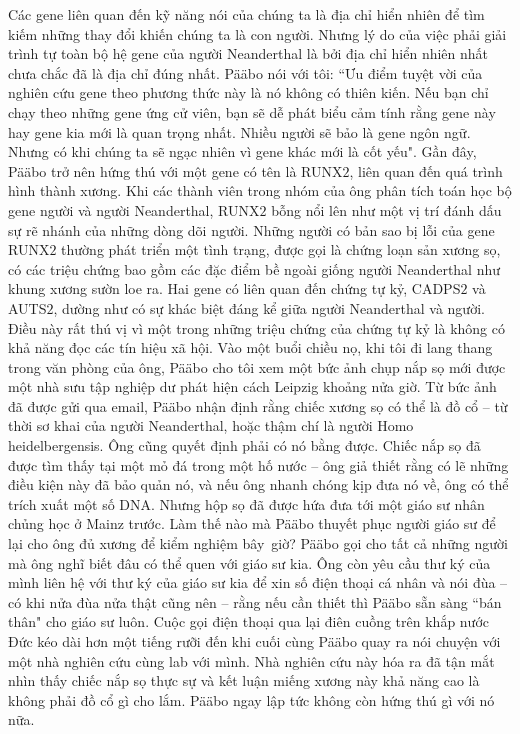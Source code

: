 \begin{multicols}{2}
	\vskip 0.1cm
	Các gene liên quan đến kỹ năng nói của chúng ta là địa chỉ hiển nhiên để tìm kiếm những thay đổi khiến chúng ta là con người. Nhưng lý do của việc phải giải trình tự toàn bộ hệ gene của người Neanderthal là bởi địa chỉ hiển nhiên nhất chưa chắc đã là địa chỉ đúng nhất.
	\vskip 0.1cm
	Pääbo nói với tôi: ``Ưu điểm tuyệt vời của nghiên cứu gene theo phương thức này là nó không có thiên kiến. Nếu bạn chỉ chạy theo những gene ứng cử viên, bạn sẽ dễ phát biểu cảm tính rằng gene này hay gene kia mới là quan trọng nhất. Nhiều người sẽ bảo là gene ngôn ngữ. Nhưng có khi chúng ta sẽ ngạc nhiên vì gene khác mới là cốt yếu". Gần đây, Pääbo trở nên hứng thú với một gene có tên là RUNX$2$, liên quan đến quá trình hình thành xương. Khi các thành viên trong nhóm của ông phân tích toán học bộ gene người và người Neanderthal, RUNX$2$ bỗng nổi lên như một vị trí đánh dấu sự rẽ nhánh của những dòng dõi người.
	\vskip 0.1cm
	Những người có bản sao bị lỗi của gene RUNX$2$ thường phát triển một tình trạng, được gọi là chứng loạn sản xương sọ, có các triệu chứng bao gồm các đặc điểm bề ngoài giống người Neanderthal như khung xương sườn loe ra. Hai gene có liên quan đến chứng tự kỷ, CADPS$2$ và AUTS$2$, dường như có sự khác biệt đáng kể giữa người Neanderthal và người. Điều này rất thú vị vì một trong những triệu chứng của chứng tự kỷ là không có khả năng đọc các tín hiệu xã hội.
	\vskip 0.1cm
	Vào một buổi chiều nọ, khi tôi đi lang thang trong văn phòng của ông, Pääbo cho tôi xem một bức ảnh chụp nắp sọ mới được một nhà sưu tập nghiệp dư phát hiện cách Leipzig khoảng nửa giờ. Từ bức ảnh đã được gửi qua email, Pääbo nhận định rằng chiếc xương sọ có thể là đồ cổ -- từ thời sơ khai của người Neanderthal, hoặc thậm chí là người Homo heidelbergensis. Ông cũng quyết định phải có nó bằng được. Chiếc nắp sọ đã được tìm thấy tại một mỏ đá trong một hố nước -- ông giả thiết rằng có lẽ những điều kiện này đã bảo quản nó, và nếu ông nhanh chóng kịp đưa nó về, ông có thể trích xuất một số DNA. Nhưng hộp sọ đã được hứa đưa tới một giáo sư nhân chủng học ở Mainz trước. Làm thế nào mà Pääbo thuyết phục người giáo sư để lại cho ông đủ xương để kiểm nghiệm bây~giờ?
	\vskip 0.1cm
	Pääbo gọi cho tất cả những người mà ông nghĩ biết đâu có thể quen với giáo sư kia. Ông còn yêu cầu thư ký của mình liên hệ với thư ký của giáo sư kia để xin số điện thoại cá nhân và nói đùa -- có khi nửa đùa nửa thật cũng nên -- rằng nếu cần thiết thì Pääbo sẵn sàng ``bán thân" cho giáo sư luôn. Cuộc gọi điện thoại qua lại điên cuồng trên khắp nước Đức kéo dài hơn một tiếng rưỡi đến khi cuối cùng Pääbo quay ra nói chuyện với một nhà nghiên cứu cùng lab với mình. Nhà nghiên cứu này hóa ra đã tận mắt nhìn thấy chiếc nắp sọ thực sự và kết luận miếng xương này khả năng cao là không phải đồ cổ gì cho lắm. Pääbo ngay lập tức không còn hứng thú gì với nó nữa.

\end{multicols}
